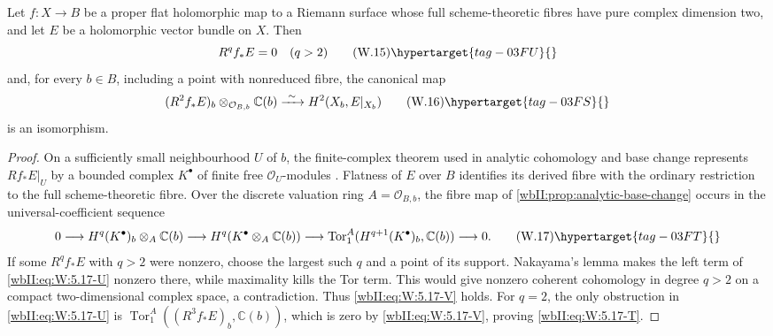 \begin{corollary}
\hypertarget{tag-03DV}{}\label{wbII:cor:surface-top-base-change}

Let $f:X\to B$ be a proper flat holomorphic map to a Riemann
surface whose full scheme-theoretic fibres have pure complex dimension two,
and let $E$ be a holomorphic vector bundle on $X$.  Then
\[
 R^qf_*E=0\quad(q>2)
 \tag{W.15}\hypertarget{tag-03FU}{}\label{wbII:eq:W:5.17-V}
\]
and, for every $b\in B$, including a point with nonreduced fibre, the
canonical map
\[
 (R^2f_*E)_b\otimes_{\mathcal O_{B,b}}\mathbb C(b)
 \xrightarrow{\ \sim\ }H^2(X_b,E|_{X_b})
 \tag{W.16}\hypertarget{tag-03FS}{}\label{wbII:eq:W:5.17-T}
\]
is an isomorphism.
\end{corollary}



\begin{proof}
On a sufficiently small neighbourhood $U$ of $b$, the finite-complex theorem
used in analytic cohomology and base change represents $Rf_*E|_U$ by a
bounded complex $K^\bullet$ of finite free $\mathcal O_U$-modules
\cite[Chapter~III, \S4, Theorem~4.1, p.~124]{BS76push}.  Flatness of
$E$ over $B$ identifies its derived fibre with the ordinary restriction to
the full scheme-theoretic fibre.  Over the discrete valuation ring
$A=\mathcal O_{B,b}$, the fibre map of
\cref{wbII:prop:analytic-base-change} occurs in the universal-coefficient sequence
\[
0\longrightarrow H^q(K^\bullet)_b\otimes_A\mathbb C(b)
 \longrightarrow H^q(K^\bullet\otimes_A\mathbb C(b))
 \longrightarrow
 \operatorname{Tor}_1^A(H^{q+1}(K^\bullet)_b,\mathbb C(b))
 \longrightarrow0.
\tag{W.17}\hypertarget{tag-03FT}{}\label{wbII:eq:W:5.17-U}
\]
If some $R^qf_*E$ with $q>2$ were nonzero, choose the largest such $q$ and a
point of its support.  Nakayama's lemma makes the left term of \eqref{wbII:eq:W:5.17-U}
nonzero there, while maximality kills the Tor term.  This would give nonzero
coherent cohomology in degree $q>2$ on a compact two-dimensional complex
space, a contradiction.  Thus \eqref{wbII:eq:W:5.17-V} holds.  For $q=2$, the only
obstruction in \eqref{wbII:eq:W:5.17-U} is
$\operatorname{Tor}_1^A((R^3f_*E)_b,\mathbb C(b))$, which is zero by
\eqref{wbII:eq:W:5.17-V}, proving \eqref{wbII:eq:W:5.17-T}.

\end{proof}